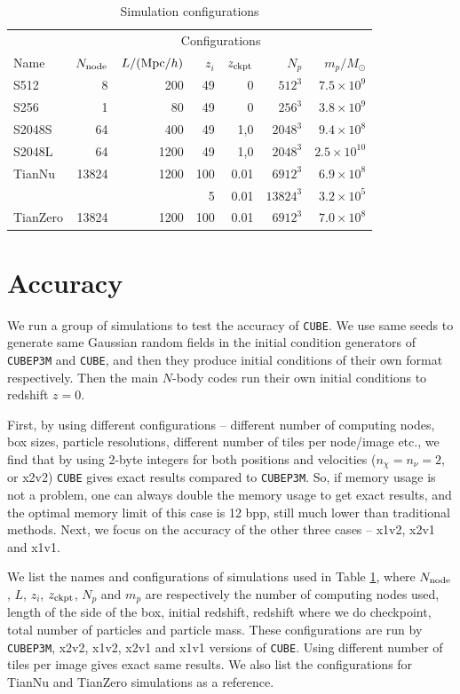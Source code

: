 \documentclass[10pt,twocolumn,preprint]{emulateapj}
\newcommand{\Msun}{M_\odot}
\begin{document}
\begin{table}[]
\centering
\caption{Simulation configurations}
\label{t.sim}
\begin{tabular}{lrrrrrr}
\hline
& \multicolumn{6}{c}{Configurations}\\
\cline{2-7}
Name  & $N_{\rm node}$ & $L/({\rm Mpc}/h)$ & $z_i$ & $z_{\rm ckpt}$ & $N_p$ & $m_p/\Msun$ \\
\hline
S512   & 8     & 200   & 49 & 0    & $512^3$  & $7.5\times 10^9$    \\
S256   & 1     & 80    & 49 & 0    & $256^3$  & $3.8\times 10^9$    \\
S2048S & 64    & 400   & 49 & 1,0  & $2048^3$ & $9.4\times 10^8$    \\
S2048L & 64    & 1200  & 49 & 1,0  & $2048^3$ & $2.5\times 10^{10}$ \\
\hline
TianNu & 13824 & 1200  & 100& 0.01 & $6912^3$ & $6.9\times 10^8$\\
       &       &       & 5  & 0.01 & $13824^3$& $3.2\times 10^5$\\
TianZero & 13824 & 1200 & 100& 0.01 & $6912^3$ & $7.0\times 10^8$\\
\hline
\end{tabular}
\end{table}

\section{Accuracy}\label{s.results}
We run a group of simulations to test the accuracy of {\tt CUBE}. We use same seeds to generate same Gaussian random fields in the initial condition generators of {\tt CUBEP3M} and {\tt CUBE}, and then they produce initial conditions of their own format respectively. Then the main $N$-body codes run their own initial conditions to redshift $z=0$.

First, by using different configurations -- different number of computing nodes, box sizes, particle resolutions, different number of tiles per node/image etc., we find that by using 2-byte integers for both positions and velocities ($n_\chi=n_\nu=2$, or x2v2) {\tt CUBE} gives exact results compared to {\tt CUBEP3M}. So, if memory usage is not a problem, one can always double the memory usage to get exact results, and the optimal memory limit of this case is 12 bpp, still much lower than traditional methods. Next, we focus on the accuracy of the other three cases -- x1v2, x2v1 and x1v1.

We list the names and configurations of simulations used in Table \ref{t.sim}, where $N_{\rm node}$, $L$, $z_i$, $z_{\rm ckpt}$, $N_p$ and $m_p$ are respectively the number of computing nodes used, length of the side of the box, initial redshift, redshift where we do checkpoint, total number of particles and particle mass. These configurations are run by {\tt CUBEP3M}, x2v2, x1v2, x2v1 and x1v1 versions of {\tt CUBE}. Using different number of tiles per image gives exact same results. We also list the configurations for TianNu and TianZero \citep{2017NatAs...1E.143Y,2017RAA....17...85E} simulations as a reference.
\end{document}
